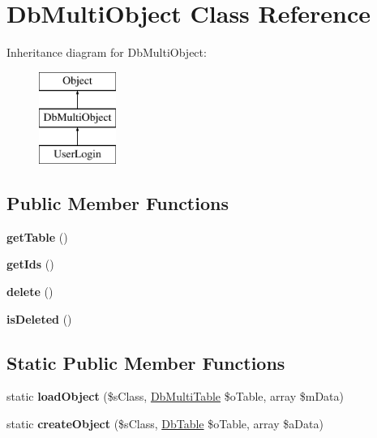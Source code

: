 \hypertarget{class_db_multi_object}{\section{Db\-Multi\-Object Class Reference}
\label{class_db_multi_object}
}
Inheritance diagram for Db\-Multi\-Object\-:\begin{figure}[H]
\begin{center}
\leavevmode
\includegraphics[height=3.000000cm]{class_db_multi_object}
\end{center}
\end{figure}
\subsection*{Public Member Functions}
\begin{DoxyCompactItemize}
\item 
\hypertarget{class_db_multi_object_a3180cf2d5df3802306fb32c80e6b2ae2}{{\bfseries get\-Table} ()}\label{class_db_multi_object_a3180cf2d5df3802306fb32c80e6b2ae2}

\item 
\hypertarget{class_db_multi_object_af78a13cce363d883b40b7016f37495d6}{{\bfseries get\-Ids} ()}\label{class_db_multi_object_af78a13cce363d883b40b7016f37495d6}

\item 
\hypertarget{class_db_multi_object_ac549813c2d1ed2590b3336b5a78e1e02}{{\bfseries delete} ()}\label{class_db_multi_object_ac549813c2d1ed2590b3336b5a78e1e02}

\item 
\hypertarget{class_db_multi_object_a9876147e88c9ef1f3ef5cc478943df58}{{\bfseries is\-Deleted} ()}\label{class_db_multi_object_a9876147e88c9ef1f3ef5cc478943df58}

\end{DoxyCompactItemize}
\subsection*{Static Public Member Functions}
\begin{DoxyCompactItemize}
\item 
\hypertarget{class_db_multi_object_a6f5b1487479a356729aaac0c6b19831e}{static {\bfseries load\-Object} (\$s\-Class, \hyperlink{class_db_multi_table}{Db\-Multi\-Table} \$o\-Table, array \$m\-Data)}\label{class_db_multi_object_a6f5b1487479a356729aaac0c6b19831e}

\item 
\hypertarget{class_db_multi_object_a797e9e79886e1cea97b4337c2a3305d5}{static {\bfseries create\-Object} (\$s\-Class, \hyperlink{class_db_table}{Db\-Table} \$o\-Table, array \$a\-Data)}\label{class_db_multi_object_a797e9e79886e1cea97b4337c2a3305d5}

\end{DoxyCompactItemize}
